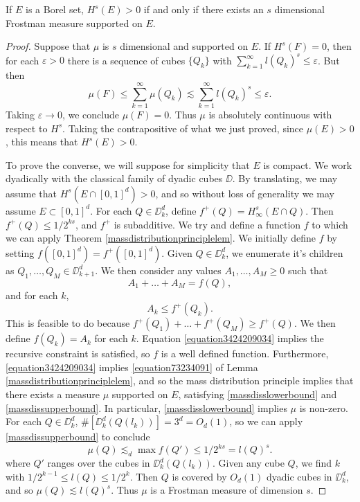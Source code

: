 \begin{theorem}
	If $E$ is a Borel set, $H^s(E) > 0$ if and only if there exists an $s$ dimensional Frostman measure supported on $E$.
\end{theorem}
\begin{proof}
	Suppose that $\mu$ is $s$ dimensional and supported on $E$. If $H^s(F) = 0$, then for each $\varepsilon > 0$ there is a sequence of cubes $\{ Q_k \}$ with $\sum_{k = 1}^\infty l(Q_k)^s \leq \varepsilon$. But then
	\[ \mu(F) \leq \sum_{k = 1}^\infty \mu(Q_k) \lesssim \sum_{k = 1}^\infty l(Q_k)^s \leq \varepsilon. \]
	Taking $\varepsilon \to 0$, we conclude $\mu(F) = 0$. Thus $\mu$ is absolutely continuous with respect to $H^s$. Taking the contrapositive of what we just proved, since $\mu(E) > 0$, this means that $H^s(E) > 0$.

	To prove the converse, we will suppose for simplicity that $E$ is compact. We work dyadically with the classical family of dyadic cubes $\DD$.  By translating, we may assume that $H^s(E \cap [0,1]^d) > 0$, and so without loss of generality we may assume $E \subset [0,1]^d$. For each $Q \in \DD_k^d$, define $f^+(Q) = H^s_\infty(E \cap Q)$. Then $f^+(Q) \leq 1/2^{ks}$, and $f^+$ is subadditive. We try and define a function $f$ to which we can apply Theorem \ref{massdistributionprinciplelem}. We initially define $f$ by setting $f([0,1]^d) = f^+([0,1]^d)$. Given $Q \in \DD_k^d$, we enumerate it's children as $Q_1, \dots, Q_M \in \DD_{k+1}^d$. We then consider any values $A_1, \dots, A_M \geq 0$ such that
  	\begin{equation} \label{equation3424209034}
  		A_1 + \dots + A_M = f(Q),
  	\end{equation}
  	and for each $k$,
  	\begin{equation} \label{equation12039123012}
  		A_k \leq f^+(Q_k).
  	\end{equation}
	This is feasible to do because $f^+(Q_1) + \dots + f^+(Q_M) \geq f^+(Q)$. We then define $f(Q_k) = A_k$ for each $k$. Equation \eqref{equation3424209034} implies the recursive constraint is satisfied, so $f$ is a well defined function. Furthermore, \eqref{equation3424209034} implies \eqref{equation73234091} of Lemma \ref{massdistributionprinciplelem}, and so the mass distribution principle implies that there exists a measure $\mu$ supported on $E$, satisfying \eqref{massdisslowerbound} and \eqref{massdissupperbound}. In particular, \eqref{massdisslowerbound} implies $\mu$ is non-zero. For each $Q \in \DD_k^d$, $\#[\DD_k^d(Q(l_k))] = 3^d = O_d(1)$, so we can apply \eqref{massdissupperbound} to conclude
	\[ \mu(Q) \lesssim_d \max f(Q') \leq 1/2^{ks} = l(Q)^s. \]
	where $Q'$ ranges over the cubes in $\DD_k^d(Q(l_k))$. Given any cube $Q$, we find $k$ with $1/2^{k-1} \leq l(Q) \leq 1/2^k$. Then $Q$ is covered by $O_d(1)$ dyadic cubes in $\DD_k^d$, and so $\mu(Q) \lesssim l(Q)^s$. Thus $\mu$ is a Frostman measure of dimension $s$.
\end{proof}

